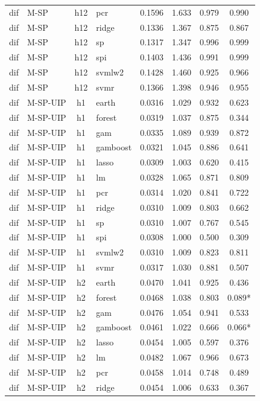 \begin{ThreePartTable}
\begin{longtable}[t]{llclcccc}
dif & M-SP & h12 & pcr & 0.1596 & 1.633 & 0.979 & 0.990\\
dif & M-SP & h12 & ridge & 0.1336 & 1.367 & 0.875 & 0.867\\
dif & M-SP & h12 & sp & 0.1317 & 1.347 & 0.996 & 0.999\\
dif & M-SP & h12 & spi & 0.1403 & 1.436 & 0.991 & 0.999\\
dif & M-SP & h12 & svmlw2 & 0.1428 & 1.460 & 0.925 & 0.966\\
dif & M-SP & h12 & svmr & 0.1366 & 1.398 & 0.946 & 0.955\\
\addlinespace
dif & M-SP-UIP & h1 & earth & 0.0316 & 1.029 & 0.932 & 0.623\\
dif & M-SP-UIP & h1 & forest & 0.0319 & 1.037 & 0.875 & 0.344\\
dif & M-SP-UIP & h1 & gam & 0.0335 & 1.089 & 0.939 & 0.872\\
dif & M-SP-UIP & h1 & gamboost & 0.0321 & 1.045 & 0.886 & 0.641\\
dif & M-SP-UIP & h1 & lasso & 0.0309 & 1.003 & 0.620 & 0.415\\
dif & M-SP-UIP & h1 & lm & 0.0328 & 1.065 & 0.871 & 0.809\\
dif & M-SP-UIP & h1 & pcr & 0.0314 & 1.020 & 0.841 & 0.722\\
dif & M-SP-UIP & h1 & ridge & 0.0310 & 1.009 & 0.803 & 0.662\\
dif & M-SP-UIP & h1 & sp & 0.0310 & 1.007 & 0.767 & 0.545\\
dif & M-SP-UIP & h1 & spi & 0.0308 & 1.000 & 0.500 & 0.309\\
dif & M-SP-UIP & h1 & svmlw2 & 0.0310 & 1.009 & 0.823 & 0.811\\
dif & M-SP-UIP & h1 & svmr & 0.0317 & 1.030 & 0.881 & 0.507\\
\addlinespace
dif & M-SP-UIP & h2 & earth & 0.0470 & 1.041 & 0.925 & 0.436\\
dif & M-SP-UIP & h2 & forest & 0.0468 & 1.038 & 0.803 & 0.089*\\
dif & M-SP-UIP & h2 & gam & 0.0476 & 1.054 & 0.941 & 0.533\\
dif & M-SP-UIP & h2 & gamboost & 0.0461 & 1.022 & 0.666 & 0.066*\\
dif & M-SP-UIP & h2 & lasso & 0.0454 & 1.005 & 0.597 & 0.376\\
dif & M-SP-UIP & h2 & lm & 0.0482 & 1.067 & 0.966 & 0.673\\
dif & M-SP-UIP & h2 & pcr & 0.0458 & 1.014 & 0.748 & 0.489\\
dif & M-SP-UIP & h2 & ridge & 0.0454 & 1.006 & 0.633 & 0.367\\

\end{longtable}
\end{ThreePartTable}
